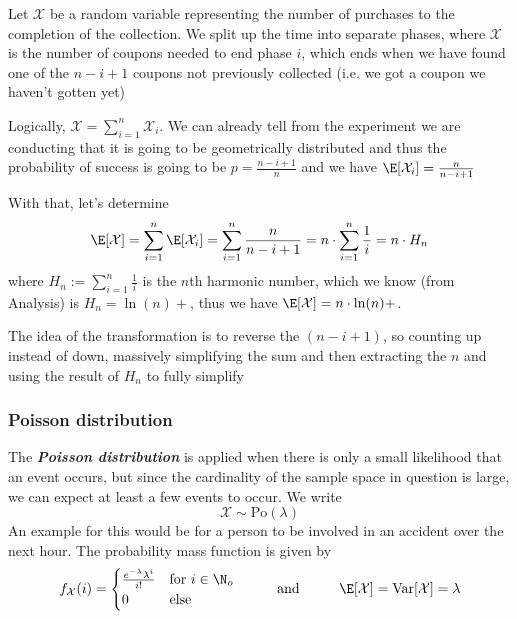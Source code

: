 Let $\mathcal{X}$ be a random variable representing the number of purchases to the completion of the collection. We split up the time into separate phases, where $\mathcal{X}$ is the number of coupons needed to end phase $i$, which ends when we have found one of the $n - i + 1$ coupons not previously collected (i.e. we got a coupon we haven't gotten yet)

Logically, $\mathcal{X} = \sum_{i = 1}^{n} \mathcal{X}_i$. We can already tell from the experiment we are conducting that it is going to be geometrically distributed and thus the probability of success is going to be $p = \frac{n - i + 1}{n}$ and we have $\E[\mathcal{X}_i] = \frac{n}{n - i + 1}$

With that, let's determine
\[
    \E[\mathcal{X}] = \sum_{i = 1}^{n} \E[\mathcal{X}_i] = \sum_{i = 1}^{n} \frac{n}{n - i + 1} = n \cdot \sum_{i = 1}^{n} \frac{1}{i} = n \cdot H_n
\]
where $H_n := \sum_{i = 1}^{n} \frac{1}{i}$ is the $n$th harmonic number, which we know (from Analysis) is $H_n = \ln(n) +$, thus we have $\E[\mathcal{X}] = n \cdot \ln(n) +$.

The idea of the transformation is to reverse the $(n - i + 1)$, so counting up instead of down, massively simplifying the sum and then extracting the $n$ and using the result of $H_n$ to fully simplify


\subsubsection{Poisson distribution}
The \textbf{\textit{Poisson distribution}} is applied when there is only a small likelihood that an event occurs, but since the cardinality of the sample space in question is large, we can expect at least a few events to occur.
We write
\[
    \mathcal{X} \sim \text{Po}(\lambda)
\]
An example for this would be for a person to be involved in an accident over the next hour. The probability mass function is given by
\[
    f_{\mathcal{X}}(i) = \begin{cases}
        \frac{e^{-\lambda}\lambda^i}{i!} & \text{for } i \in \N_o \\
        0                                & \text{else}
    \end{cases}
    \hspace{1cm} \text{and} \hspace{1cm} \E[\mathcal{X}] = \text{Var}[\mathcal{X}] = \lambda
\]


